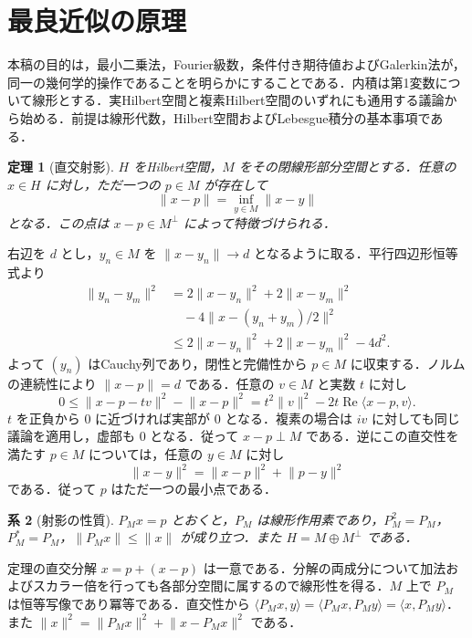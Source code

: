 \documentclass[a5paper,10pt,onecolumn]{jsarticle}
\makeatletter
\theoremstyle{mathnotetheorem}
\newtheorem{theorem}{定理}[section]
\newtheorem{corollary}[theorem]{系}
\renewcommand{\proofname}{証明}
\renewenvironment{proof}[1][\proofname]{%
  \par\pushQED{\qed}\normalfont\topsep4\p@\@plus2\p@\relax
  \trivlist\item[\hskip\labelsep\bfseries #1]\ignorespaces
}{\popQED\endtrivlist\@endpefalse}
\newcommand{\norm}[1]{\lVert #1\rVert}
\makeatother
\begin{document}
\section{最良近似の原理}
本稿の目的は，最小二乗法，Fourier級数，条件付き期待値およびGalerkin法が，同一の幾何学的操作であることを明らかにすることである．内積は第1変数について線形とする．実Hilbert空間と複素Hilbert空間のいずれにも通用する議論から始める．前提は線形代数，Hilbert空間およびLebesgue積分の基本事項である．

\begin{theorem}[直交射影]\label{thm:proj}
$H$ をHilbert空間，$M$ をその閉線形部分空間とする．任意の $x\in H$ に対し，ただ一つの $p\in M$ が存在して
\[
 \norm{x-p}=\inf_{y\in M}\norm{x-y}
\]
となる．この点は $x-p\in M^\perp$ によって特徴づけられる．
\end{theorem}
\begin{proof}
右辺を $d$ とし，$y_n\in M$ を $\norm{x-y_n}\to d$ となるように取る．平行四辺形恒等式より
\begin{align*}
 \norm{y_n-y_m}^2&=2\norm{x-y_n}^2+2\norm{x-y_m}^2\\
 &\quad-4\norm{x-(y_n+y_m)/2}^2\\
 &\le 2\norm{x-y_n}^2+2\norm{x-y_m}^2-4d^2.
\end{align*}
よって $(y_n)$ はCauchy列であり，閉性と完備性から $p\in M$ に収束する．ノルムの連続性により $\norm{x-p}=d$ である．任意の $v\in M$ と実数 $t$ に対し
\[
 0\le\norm{x-p-tv}^2-\norm{x-p}^2
 =t^2\norm v^2-2t\operatorname{Re}\langle x-p,v\rangle.
\]
$t$ を正負から $0$ に近づければ実部が $0$ となる．複素の場合は $iv$ に対しても同じ議論を適用し，虚部も $0$ となる．従って $x-p\perp M$ である．逆にこの直交性を満たす $p\in M$ については，任意の $y\in M$ に対し
\begin{equation}\label{eq:pyth}
 \norm{x-y}^2=\norm{x-p}^2+\norm{p-y}^2
\end{equation}
である．従って $p$ はただ一つの最小点である．
\end{proof}

\begin{corollary}[射影の性質]\label{cor:proj}
$P_Mx=p$ とおくと，$P_M$ は線形作用素であり，$P_M^2=P_M$，$P_M^*=P_M$，$\norm{P_Mx}\le\norm{x}$ が成り立つ．また $H=M\oplus M^\perp$ である．
\end{corollary}
\begin{proof}
定理の直交分解 $x=p+(x-p)$ は一意である．分解の両成分について加法およびスカラー倍を行っても各部分空間に属するので線形性を得る．$M$ 上で $P_M$ は恒等写像であり冪等である．直交性から
$\langle P_Mx,y\rangle=\langle P_Mx,P_My\rangle=\langle x,P_My\rangle$．また $\norm{x}^2=\norm{P_Mx}^2+\norm{x-P_Mx}^2$ である．
\end{proof}
\end{document}
